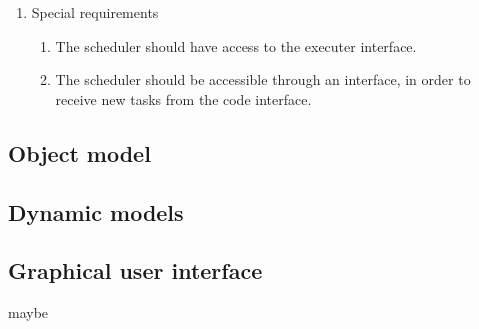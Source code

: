\begin{enumerate}[1. ]
\item Special requirements

\begin{enumerate}
\item The scheduler should have access to the executer interface.
\item The scheduler should be accessible through an interface, in order to receive new tasks from the code interface.
\end{enumerate}

\end{enumerate}

\subsection{Object model}

\subsection{Dynamic models}

\subsection{Graphical user interface}
			maybe